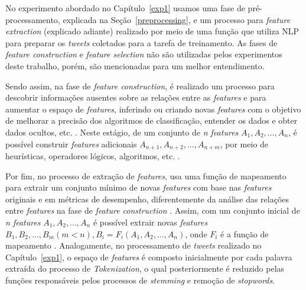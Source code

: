 \documentclass[
	12pt,				%
	oneside,			%
	a4paper,			%
	english,			%
	brazil				%
	]{abntex2ppgsi}
\begin{document}
{No experimento abordado no Capítulo~\ref{exp1} usamos uma fase de pré-processamento, explicada na Seção~\ref{preprocessing}, e um processo para \textit{feature extraction} (explicado adiante) realizado por meio de uma função que utiliza NLP para preparar os \textit{tweets} coletados para a tarefa de treinamento. As fases de \textit{feature construction} e \textit{feature selection} não são utilizadas pelos experimentos deste trabalho, porém, são mencionadas para um melhor entendimento.

Sendo assim, na fase de \textit{feature construction}, é realizado um processo para descobrir informações ausentes sobre as relações entre as \textit{features} e para aumentar o espaço de \textit{features}, inferindo ou criando novas \textit{features} com o objetivo de melhorar a precisão dos algoritmos de classificação, entender os dados e obter dados ocultos, etc. \cite{motoda2002feature}. Neste estágio, de um conjunto de \textit{n features} $ A_1, A_2, ..., A_n $, é possível construir \textit{features} adicionais $ A_ {n + 1}, A_ {n + 2}, ... , A_ {n + m} $, por meio de heurísticas, operadores lógicos, algoritmos, etc. \cite{motoda2002feature}.

Por fim, no processo de extração de \textit{features}, usa uma função de mapeamento para extrair um conjunto mínimo de novas \textit{features} com base nas \textit{features} originais e em métricas de desempenho, diferentemente da análise das relações entre \textit{features} na fase de \textit{feature construction} \cite{motoda2002feature}. Assim, com um conjunto inicial de \textit{n features} $ A_1, A_2, ..., A_n $ é possível extrair novas \textit{features} $ B_1, B_2, ..., B_m (m < n), B_i = F_i (A_1, A_2, ..., A_n) $, onde $ F_i $ é a função de mapeamento \cite {motoda2002feature}. Analogamente, no processamento de \textit{tweets} realizado no Capítulo~\ref{exp1}, o espaço de \textit{features} é composto inicialmente por cada palavra extraída do processo de \textit{Tokenization}, o qual posteriormente é reduzido pelas funções responsáveis pelos processos de \textit{stemming} e remoção de \textit{stopwords}.



}
\end{document}
